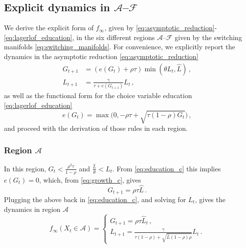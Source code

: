 \documentclass[a4paper,fleqn]{cas-sc}
\begin{document}
\subsection{Explicit dynamics in $\mathcal A$--$\mathcal F$}\label{appenix_C1}

We derive the explicit form of $f_{\infty}$, given by \eqref{eq:asymptotic_reduction}-\eqref{eq:lagerlof_education}, in the six different regions $\mathcal A$--$\mathcal F$ given by the switching manifolds \eqref{eq:switching_manifolds}.
For convenience, we explicitly report the dynamics in the asymptotic reduction \eqref{eq:asymptotic_reduction}
%
\begin{subequations}\label{eq:system_c}
    \begin{align}
        G_{t+1} &= (e(G_t) + \rho\tau)\min(\theta L_t, \hat L)\,, \label{eq:growth_c} \\
        L_{t+1} &= \frac{\gamma}{\tau + e(G_{t+1})} L_t\,, \label{eq:population_c}
    \end{align}
\end{subequations}
%
as well as the functional form for the choice variable education \eqref{eq:lagerlof_education}
%
\begin{equation}\label{eq:education_c}
    e(G_t)=\max\!\big(0,-\rho\tau + \sqrt{\tau(1-\rho)G_t}\big)\,,
\end{equation}
%
and proceed with the derivation of those rules in each region.

\subsubsection{Region $\mathcal{A}$}\label{appenix_C_1}

In this region, $G_t<\frac{\rho^2\tau}{1-\rho}$ and $\frac{\hat{L}}{\theta}<L_t$. 
From \eqref{eq:education_c} this implies $e(G_t) = 0$, which, from \eqref{eq:growth_c}, gives
%
\begin{equation*}
    G_{t+1} = \rho\tau\hat L\,.
\end{equation*}
%
Plugging the above back in \eqref{eq:education_c}, and solving for $L_t$, gives the dynamics in region $\mathcal A$
%
\begin{equation}\label{eq:dynamics_in_A}
    f_{\infty}(X_t\in\mathcal A) = \begin{cases}
                            G_{t+1} = \rho\tau\hat L_t\,, \\[8pt]
                            L_{t+1} = \frac{\gamma}{\tau(1-\rho) + \sqrt{\hat{L}(1-\rho)\rho}} L_t\,.
                      \end{cases}
\end{equation}
\end{document}
